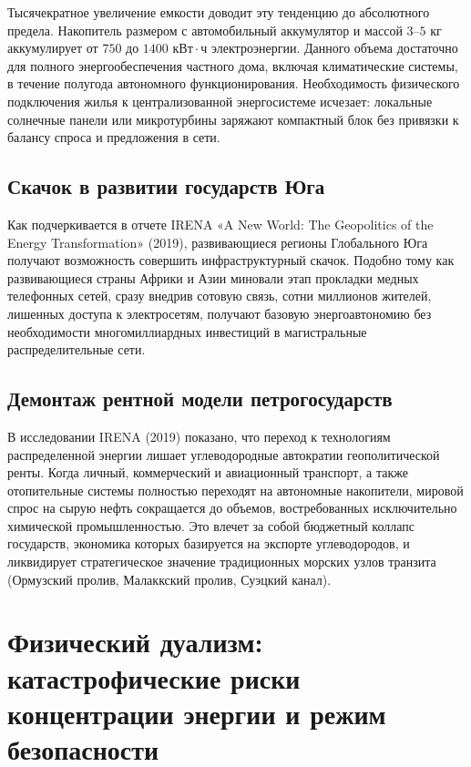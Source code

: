 \documentclass[12pt,a4paper]{article}
\begin{document}
Тысячекратное увеличение емкости доводит эту тенденцию 
до абсолютного предела. Накопитель размером с автомобильный 
аккумулятор и массой $3\text{--}5\text{ кг}$ аккумулирует от $750$ 
до $1400\text{ кВт}\cdot\text{ч}$ электроэнергии. Данного объема 
достаточно для полного энергообеспечения частного дома, включая 
климатические системы, в течение полугода автономного 
функционирования. Необходимость физического подключения жилья к 
централизованной энергосистеме исчезает: локальные солнечные панели 
или микротурбины заряжают компактный блок без привязки к балансу 
спроса и предложения в сети.

\subsection{Скачок в развитии государств Юга}

Как подчеркивается в отчете IRENA 
«A New World: The Geopolitics of the Energy Transformation» (2019), 
развивающиеся регионы Глобального Юга получают возможность совершить 
инфраструктурный скачок. Подобно тому как развивающиеся 
страны Африки и Азии миновали этап прокладки медных телефонных сетей, 
сразу внедрив сотовую связь, сотни миллионов жителей, лишенных доступа 
к электросетям, получают базовую энергоавтономию без необходимости 
многомиллиардных инвестиций в магистральные распределительные сети.

\subsection{Демонтаж рентной модели петрогосударств}

В исследовании IRENA (2019) показано, что переход к технологиям 
распределенной энергии лишает углеводородные автократии 
геополитической ренты. Когда личный, коммерческий и авиационный 
транспорт, а также отопительные системы полностью переходят на 
автономные накопители, мировой спрос на сырую нефть сокращается до 
объемов, востребованных исключительно химической промышленностью. Это 
влечет за собой бюджетный коллапс государств, экономика которых 
базируется на экспорте углеводородов, и ликвидирует стратегическое 
значение традиционных морских узлов транзита (Ормузский пролив, 
Малаккский пролив, Суэцкий канал).

\section{Физический дуализм: катастрофические риски концентрации 
энергии и режим безопасности}
\end{document}
